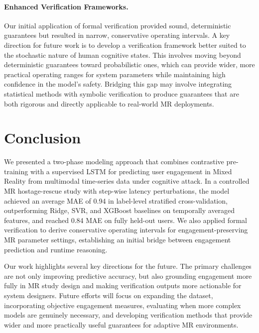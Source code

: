 \documentclass[review]{vgtc}                 %
\begin{document}
\paragraph{Enhanced Verification Frameworks.} Our initial application of formal verification provided sound, deterministic guarantees but resulted in narrow, conservative operating intervals. A key direction for future work is to develop a verification framework better suited to the stochastic nature of human cognitive states. This involves moving beyond deterministic guarantees toward probabilistic ones, which can provide wider, more practical operating ranges for system parameters while maintaining high confidence in the model's safety. Bridging this gap may involve integrating statistical methods with symbolic verification to produce guarantees that are both rigorous and directly applicable to real-world MR deployments.

\section{Conclusion}
We presented a two-phase modeling approach that combines contrastive pre-training with a supervised LSTM for predicting user engagement in Mixed Reality from multimodal time-series data under cognitive attack. In a controlled MR hostage-rescue study with step-wise latency perturbations, the model achieved an average MAE of 0.94 in label-level stratified cross-validation, outperforming Ridge, SVR, and XGBoost baselines on temporally averaged features, and reached 0.84 MAE on fully held-out users. We also applied formal verification to derive conservative operating intervals for engagement-preserving MR parameter settings, establishing an initial bridge between engagement prediction and runtime reasoning.

Our work highlights several key directions for the future. The primary challenges are not only improving predictive accuracy, but also grounding engagement more fully in MR study design and making verification outputs more actionable for system designers. Future efforts will focus on expanding the dataset, incorporating objective engagement measures, evaluating when more complex models are genuinely necessary, and developing verification methods that provide wider and more practically useful guarantees for adaptive MR environments.



\end{document}
